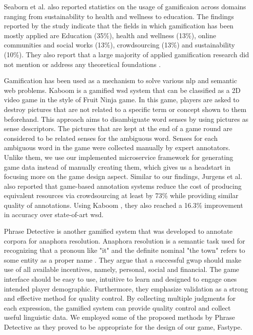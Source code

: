 Seaborn et al. \cite{47} also reported statistics on the usage of gamificaion across domains ranging from sustainability to health and wellness to education. The findings reported by the study indicate that the fields in which gamification has been mostly applied are Education (35\%), health and wellness (13\%), online communities and social works (13\%), crowdsourcing (13\%) and sustainability (10\%). They also report that a large majority of applied gamification research did not mention or address any theoretical foundations \cite{47}.

Gamification has been used as a mechanism to solve various \ac{nlp} and semantic web problems. Kaboom \cite{41} is a gamified \ac{wsd} system that can be classified as a 2D video game in the style of Fruit Ninja game. In this game, players are asked to destroy pictures that are not related to a specific term or concept shown to them beforehand. This approach aims to disambiguate word senses by using pictures as sense descriptors. The pictures that are kept at the end of a game round are considered to be related senses for the ambiguous word. Senses for each ambiguous word in the game were collected manually by expert annotators. Unlike them, we use our implemented microservice framework for generating game data instead of manually creating them, which gives us a headstart in focusing more on the game design aspect. Similar to our findings, Jurgens et al. \cite{41} also reported that game-based annotation systems reduce the cost of producing equivalent resources via crowdsourcing at least by 73\% while providing similar quality of annotations. Using Kaboom \cite{41}, they also reached a 16.3\% improvement in accuracy over state-of-art \ac{wsd}.

Phrase Detective \cite{44} is another gamified system that was developed to annotate corpora for anaphora resolution. Anaphora resolution is a semantic task used for recognizing that a pronoun like "it" and the definite nominal "the town" refers to some entity as a proper name \cite{44}. They argue that a successful \ac{gwap} should make use of all available incentives, namely, personal, social and financial. The game interface should be easy to use, intuitive to learn and designed to engage ones intended player demographic. Furthermore, they emphasize validation as a strong and effective method for quality control. By collecting multiple judgments for each expression, the gamified system can provide quality control and collect useful linguistic data. We employed some of the proposed methods by Phrase Detective as they proved to be appropriate for the design of our game, Fastype. 

